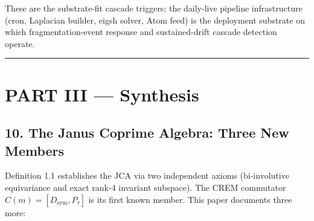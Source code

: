 \documentclass[
]{article}
\begin{document}
These are the substrate-fit cascade triggers; the daily-live pipeline
infrastructure (cron, Laplacian builder, eigsh solver, Atom feed) is the
deployment substrate on which fragmentation-event response and
sustained-drift cascade detection operate.

\begin{center}\rule{0.5\linewidth}{0.5pt}\end{center}

\section{PART III --- Synthesis}\label{part-iii-synthesis}

\subsection{10. The Janus Coprime Algebra: Three New
Members}\label{the-janus-coprime-algebra-three-new-members}

Definition 1.1 establishes the JCA via two independent axioms
(bi-involutive equivariance and exact rank-4 invariant subspace). The
CREM commutator \(C(m) = [D_\text{sym}, P_\tau]\) is its first known
member. This paper documents three more:
\end{document}
